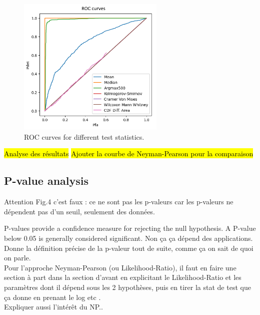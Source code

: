 \documentclass{article}
\newcommand{\dm}[1]{{\color{mulberry} #1}}
\begin{document}
\begin{figure}[H]
\centering
\includegraphics[width=7cm]{img/roc_curves.png}
\caption{ROC curves for different test statistics.}
\label{fig:roc}
\end{figure}

\hl{Analyse des résultats}
\hl{Ajouter la courbe de Neyman-Pearson pour la comparaison}

\subsection{P-value analysis}

\dm{Attention Fig.4 c'est faux : ce ne sont pas les p-valeurs car les p-valeurs ne dépendent pas d'un seuil, seulement des données.}

P-values provide a confidence measure for rejecting the null hypothesis. A P-value below 0.05 is generally considered significant. \dm{Non ça ça dépend des applications. Donne la définition précise de la p-valeur tout de suite, comme ça on sait de quoi on parle. }\\

\dm{Pour l'approche Neyman-Pearson (ou Likelihood-Ratio), il faut en faire une section à part dans la section d'avant en explicitant le Likelihood-Ratio et les paramètres dont il dépend sous les 2 hypothèses, puis en tirer la stat de test que ça donne en prenant le log etc .\\
Expliquer aussi l'intérêt du NP.}.
\end{document}
